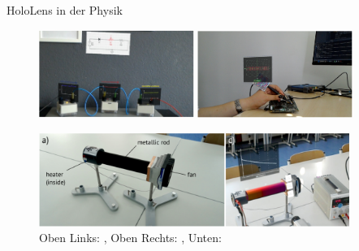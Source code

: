\begin{frame}[fragile]{HoloLens in der Physik}

\begin{figure}
\includegraphics[width=0.45\textwidth]{images/Amiraslanov18.png}
\includegraphics[width=0.45\textwidth]{images/Javaheri18.png}
\begin{center}
\vspace{0.05cm}
\includegraphics[width=0.9\textwidth]{images/Strzys18.png}	
\end{center}
\setlength{\abovecaptionskip}{5pt plus 5pt minus 2pt}
\caption*{Oben Links: \citep{Amiraslanov18}, Oben Rechts: \cite{Javaheri18}, Unten: \cite{Strzys18}}
\end{figure}

\end{frame}

